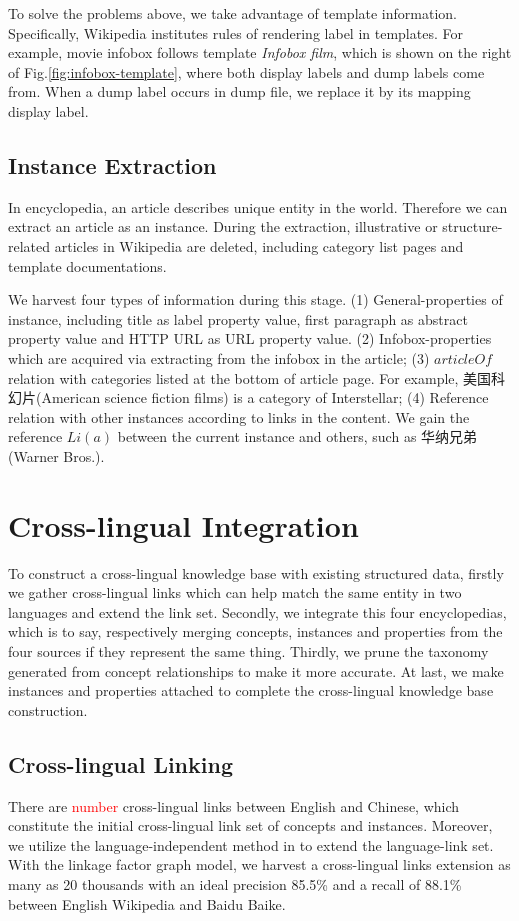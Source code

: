 \documentclass[runningheads,a4paper]{llncs}
\begin{document}
To solve the problems above, we take advantage of template information. Specifically, Wikipedia institutes rules of rendering label in templates. For example, movie infobox follows template \emph{Infobox film}, which is shown on the right of Fig.\ref{fig:infobox-template}, where both display labels and dump labels come from. When a dump label occurs in dump file, we replace it by its mapping display label.

\subsection{Instance Extraction}
\label{sec:ie}
In encyclopedia, an article describes unique entity in the world. Therefore we can extract an article as an instance. During the extraction, illustrative or structure-related articles in Wikipedia are deleted, including category list pages and template documentations.

We harvest four types of information during this stage. (1) General-properties of instance, including title as label property value, first paragraph as abstract property value and HTTP URL as URL property value. (2) Infobox-properties which are acquired via extracting from the infobox in the article; (3) $articleOf$ relation with categories listed at the bottom of article page. For example, 美国科幻片(American science fiction films) is a category of Interstellar; (4) Reference relation with other instances according to links in the content. We gain the reference $Li(a)$ between the current instance and others, such as 华纳兄弟(Warner Bros.).

\section{Cross-lingual Integration}
\label{sec:clkbb}

To construct a cross-lingual knowledge base with existing structured data, firstly we gather cross-lingual links which can help match the same entity in two languages and extend the link set. Secondly, we integrate this four encyclopedias, which is to say, respectively merging concepts, instances and properties from the four sources if they represent the same thing. Thirdly, we prune the taxonomy generated from concept relationships to make it more accurate. At last, we make instances and properties attached to complete the cross-lingual knowledge base construction.

\subsection{Cross-lingual Linking}
There are \textcolor{red}{number} cross-lingual links between English and Chinese, which constitute the initial cross-lingual link set of concepts and instances. Moreover, we utilize the language-independent method in \cite{wang2012cross} to extend the language-link set. With the linkage factor graph model, we harvest a cross-lingual links extension as many as 20 thousands with an ideal precision 85.5\% and a recall of 88.1\% between English Wikipedia and Baidu Baike.
\end{document}
